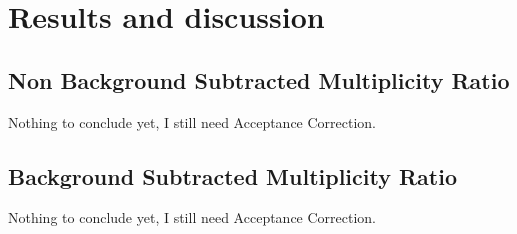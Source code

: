 \chapter{Results and discussion}

\section{Non Background Subtracted Multiplicity Ratio}
Nothing to conclude yet, I still need Acceptance Correction.

\section{Background Subtracted Multiplicity Ratio}
Nothing to conclude yet, I still need Acceptance Correction.


